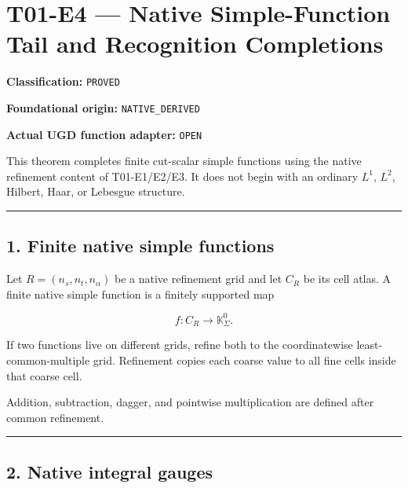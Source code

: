 \hypertarget{t01-e4-native-simple-function-tail-and-recognition-completions}{%
\chapter{T01-E4 --- Native Simple-Function Tail and Recognition Completions}\label{t01-e4-native-simple-function-tail-and-recognition-completions}}

\textbf{Classification:} \texttt{PROVED}

\textbf{Foundational origin:} \texttt{NATIVE\_DERIVED}

\textbf{Actual UGD function adapter:} \texttt{OPEN}

This theorem completes finite cut-scalar simple functions using the native
refinement content of T01-E1/E2/E3. It does not begin with an ordinary
\(L^1\), \(L^2\), Hilbert, Haar, or Lebesgue structure.

\begin{center}\rule{0.5\linewidth}{0.5pt}\end{center}

\hypertarget{finite-native-simple-functions}{%
\section{1. Finite native simple functions}\label{finite-native-simple-functions}}

Let \(R=(n_s,n_t,n_\alpha)\) be a native refinement grid and let
\(C_R\) be its cell atlas. A finite native simple function is a finitely
supported map

\[
f:C_R\to\mathbb K_\Sigma^0.
\tag{1.1}
\]

If two functions live on different grids, refine both to the coordinatewise
least-common-multiple grid. Refinement copies each coarse value to all fine cells
inside that coarse cell.

Addition, subtraction, dagger, and pointwise multiplication are defined after
common refinement.

\begin{center}\rule{0.5\linewidth}{0.5pt}\end{center}

\hypertarget{native-integral-gauges}{%
\section{2. Native integral gauges}\label{native-integral-gauges}}

